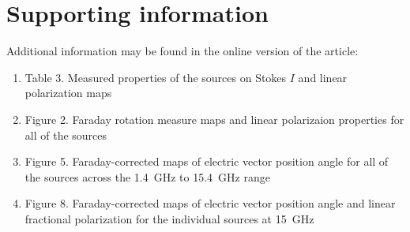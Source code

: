 \documentclass[a4paper,fleqn,usenatbib,useAMS]{mnras}
\begin{document}






\appendix
\section{Supporting information}

Additional information may be found in the online version of the article:
\begin{enumerate}
\item Table 3. Measured properties of the sources on Stokes $I$ and linear polarization maps
\item Figure 2. Faraday rotation measure maps and linear polarizaion properties for all of the sources
\item Figure 5. Faraday-corrected maps of electric vector position angle for all of the sources across the 1.4~GHz to 15.4~GHz range
\item Figure 8. Faraday-corrected maps of electric vector position angle and linear fractional polarization for the individual sources at 15~GHz
\end{enumerate}



\bsp
\label{lastpage}
\end{document}
